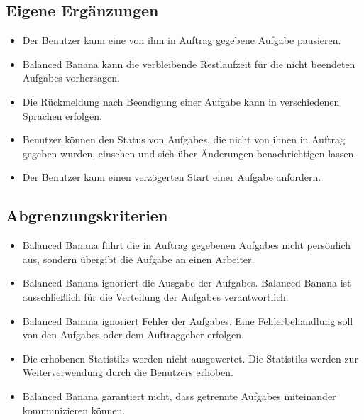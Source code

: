 \documentclass[a4paper,12pt]{article}
\begin{document}
\subsection{Eigene Ergänzungen}
\begin{itemize}[nosep]

	\item Der \gls{Benutzer} kann eine von ihm in Auftrag gegebene \gls{Aufgabe} pausieren.	
	
	\item Balanced Banana kann die verbleibende Restlaufzeit für die nicht beendeten \glspl{Aufgabe} vorhersagen.
	
	\item Die Rückmeldung nach Beendigung einer \gls{Aufgabe} kann in verschiedenen Sprachen erfolgen.
	
	\item \gls{Benutzer} können den Status von \glspl{Aufgabe}, die nicht von ihnen in Auftrag gegeben wurden, einsehen und 	sich über Änderungen benachrichtigen lassen.
	
	\item Der \gls{Benutzer} kann einen verzögerten Start einer \gls{Aufgabe} anfordern.
	
\end{itemize}

\subsection{Abgrenzungskriterien}
\begin{itemize}[nosep]

	\item Balanced Banana führt die in Auftrag gegebenen \glspl{Aufgabe} nicht persönlich aus, sondern übergibt die \gls{Aufgabe} an einen \gls{Arbeiter}.
	
	\item Balanced Banana ignoriert die Ausgabe der \glspl{Aufgabe}. Balanced Banana ist ausschließlich für die Verteilung der \glspl{Aufgabe} verantwortlich.

	\item Balanced Banana ignoriert Fehler der \glspl{Aufgabe}. Eine \gls{Fehlerbehandlung} soll von den \glspl{Aufgabe} oder dem \gls{Auftraggeber} erfolgen.

	\item Die erhobenen \glspl{Statistik} werden nicht ausgewertet. Die \glspl{Statistik} werden zur Weiterverwendung durch die \glspl{Benutzer} erhoben.
	
	\item Balanced Banana garantiert nicht, dass getrennte \glspl{Aufgabe} miteinander kommunizieren können.
	
\end{itemize}
\end{document}
